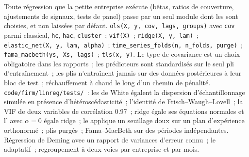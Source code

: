 \begin{build}
 Toute régression que la petite entreprise exécute (bêtas, ratios de couverture, ajustements de signaux, tests de panel) passe par un seul module dont
les  sont choisies, et non laissées par défaut.
 \texttt{ols(X, y, cov, lags, groups)} avec \texttt{cov} parmi classical, \texttt{hc}, \texttt{hac}, \texttt{cluster}~;
\texttt{vif(X)}~; \texttt{ridge(X, y, lam)}~; \texttt{elastic\_net(X, y, lam, alpha)}~; \texttt{time\_series\_folds(n, n\_folds, purge)}~;
\texttt{fama\_macbeth(ys, Xs, lags)}~; \texttt{tls(x, y)}.
 Le type de covariance est un choix obligatoire dans les rapports~; les prédicteurs sont standardisés sur le seul pli d'entraînement~; les plis n'entraînent jamais
sur des données postérieures à leur bloc de test~; réchauffement à chaud le long d'un chemin de pénalité.
 \texttt{code/firm/linreg/tests/}~: les  de White égalent la dispersion d'échantillonnage simulée en présence d'hétéroscédasticité~;
l'identité de Frisch--Waugh--Lovell~; la VIF de deux variables de corrélation 0.97~; ridge égale ses équations normales et l' avec
$\alpha = 0$ égale ridge~; le  applique un seuillage doux sur un plan d'expérience orthonormé~; plis purgés~; Fama--MacBeth sur des périodes indépendantes.
 Régression de Deming avec un rapport de variances d'erreur connu~; le  adaptatif~; regroupement à deux voies par entreprise et par mois.
\end{build}

